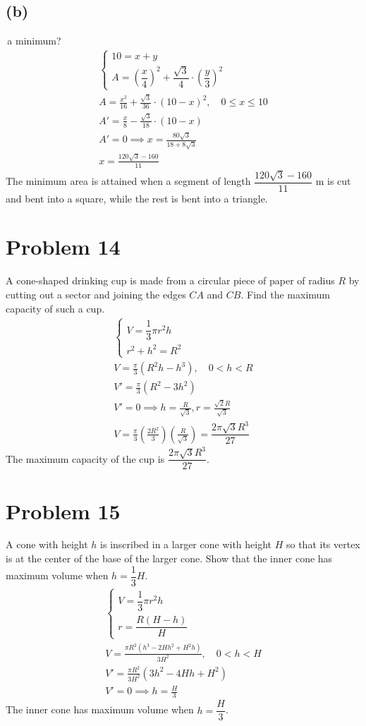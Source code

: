 \documentclass[12pt]{article}
\newcommand{\problem}[1]{\section{Problem #1}}
\newcommand{\subproblem}[1]{\subsection{(#1)} \,}
\begin{document}
\subproblem{b}a minimum?
\begin{gather*}
    \begin{cases}
        10=x+y\\
        A=(\dfrac{x}{4})^2+\dfrac{\sqrt{3}}{4}\cdot (\dfrac{y}{3})^2
    \end{cases}\\
    A=\frac{x^2}{16}+\frac{\sqrt{3}}{36}\cdot (10-x)^2,  \quad 0\le x\le 10\\
    A'=\frac{x}{8}-\frac{\sqrt{3}}{18}\cdot (10-x)\\
    A'=0 \implies x=\frac{80\sqrt{3}}{18+8\sqrt{3}}\\
    \boxed{x=\frac{120\sqrt{3}-160}{11}}
\end{gather*}
The minimum area is attained when a segment of length $\dfrac{120\sqrt{3}-160}{11}$ m is cut and bent into a square, while the rest is bent into a triangle.

\problem{14}
A cone-shaped drinking cup is made from a circular piece of paper of radius $R$ by cutting out a sector
and joining the edges $CA$ and $CB$. Find the maximum capacity of such a cup.
\begin{gather*}
    \begin{cases}
        V=\dfrac{1}{3} \pi r^2h\\
        r^2+h^2=R^2
    \end{cases}\\
    V=\frac{\pi}{3}(R^2h-h^3),\quad 0<h<R\\
    V'=\frac{\pi}{3}(R^2-3h^2)\\
    V'=0 \implies h=\frac{R}{\sqrt{3}}, r=\frac{\sqrt{2}R}{\sqrt{3}}\\
    V=\frac{\pi}{3}(\frac{2R^2}{3})(\frac{R}{\sqrt{3}})=\boxed{\dfrac{2\pi\sqrt{3}R^3}{27}}
\end{gather*}
The maximum capacity of the cup is $\dfrac{2\pi\sqrt{3}R^3}{27}$.

\problem{15}
A cone with height $h$ is inscribed in a larger cone with height $H$ so that its vertex is at the center of the base of the larger cone. Show that the inner cone has maximum volume when $h = \dfrac{1}{3}H$.
\begin{gather*}
    \begin{cases}
        V=\dfrac{1}{3}\pi r^2h\\
        r=\dfrac{R(H-h)}{H}
    \end{cases}\\
    V=\frac{\pi R^2(h^3-2Hh^2+H^2h)}{3H^2}, \quad 0<h<H\\
    V'=\frac{\pi R^2}{3H^2}(3h^2-4Hh+H^2)\\
    V'=0 \implies \boxed{h=\frac{H}{3}}
\end{gather*}
The inner cone has maximum volume when $h=\dfrac{H}{3}$.
\end{document}

